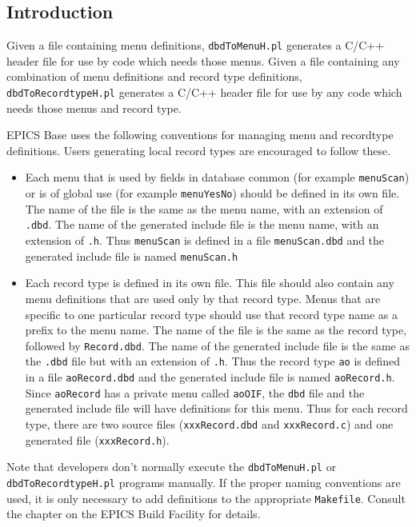 \subsection{Introduction}

Given a file containing menu definitions, \verb|dbdToMenuH.pl| generates a C/C++ header file for use by code which needs those menus.
Given a file containing any combination of menu definitions and record type definitions, \verb|dbdToRecordtypeH.pl| generates a C/C++ header file for use by any code which needs those menus and record type.

EPICS Base uses the following conventions for managing menu and recordtype definitions.
Users generating local record types are encouraged to follow these.

\begin{itemize}
\item Each menu that is used by fields in database common (for example \verb|menuScan|) or is of global use (for example \verb|menuYesNo|) should be defined in its own file.
The name of the file is the same as the menu name, with an extension of \verb|.dbd|.
The name of the generated include file is the menu name, with an extension of \verb|.h|.
Thus \verb|menuScan| is defined in a file \verb|menuScan.dbd| and the generated include file is named \verb|menuScan.h|

\item Each record type is defined in its own file.
This file should also contain any menu definitions that are used only by that record type.
Menus that are specific to one particular record type should use that record type name as a prefix to the menu name.
The name of the file is the same as the record type, followed by \verb|Record.dbd|.
The name of the generated include file is the same as the \verb|.dbd| file but with an extension of \verb|.h|.
Thus the record type \verb|ao| is defined in a file \verb|aoRecord.dbd| and the generated include file is named \verb|aoRecord.h|.
Since \verb|aoRecord| has a private menu called \verb|aoOIF|, the \verb|dbd| file and the generated include file will have definitions for this menu.
Thus for each record type, there are two source files (\verb|xxxRecord.dbd| and \verb|xxxRecord.c|) and one generated file (\verb|xxxRecord.h|).
\end{itemize}

Note that developers don't normally execute the \verb|dbdToMenuH.pl| or \verb|dbdToRecordtypeH.pl| programs manually.
If the proper naming conventions are used, it is only necessary to add definitions to the appropriate \verb|Makefile|.
Consult the chapter on the EPICS Build Facility for details.

